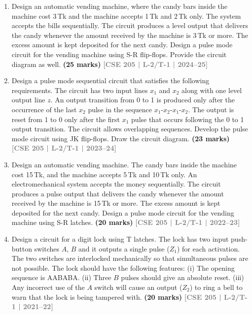 \documentclass[12pt,a3paper]{article}
\newcommand{\yr}[1]{\hfill\textcolor{gray}{\small\textbf{[#1]}}}
\newcommand{\mk}[1]{\textcolor{orange!70!black}{\small\textbf{(#1 marks)}}}
\begin{document}
\begin{enumerate}

\item Design an automatic vending machine, where the candy bars inside the machine cost 3\,Tk and the machine accepts 1\,Tk and 2\,Tk only. The system accepts the bills sequentially. The circuit produces a level output that delivers the candy whenever the amount received by the machine is 3\,Tk or more. The excess amount is kept deposited for the next candy. Design a pulse mode circuit for the vending machine using S-R flip-flops. Provide the circuit diagram as well.
\mk{25} \yr{CSE 205 | L-2/T-1 | 2024--25}

\item Design a pulse mode sequential circuit that satisfies the following requirements. The circuit has two input lines $x_1$ and $x_2$ along with one level output line $z$. An output transition from 0 to 1 is produced only after the occurrence of the last $x_2$ pulse in the sequence $x_1\text{-}x_2\text{-}x_1\text{-}x_2$. The output is reset from 1 to 0 only after the first $x_1$ pulse that occurs following the 0 to 1 output transition. The circuit allows overlapping sequences. Develop the pulse mode circuit using JK flip-flops. Draw the circuit diagram.
\mk{23} \yr{CSE 205 | L-2/T-1 | 2023--24}

\item Design an automatic vending machine. The candy bars inside the machine cost 15\,Tk, and the machine accepts 5\,Tk and 10\,Tk only. An electromechanical system accepts the money sequentially. The circuit produces a pulse output that delivers the candy whenever the amount received by the machine is 15\,Tk or more. The excess amount is kept deposited for the next candy. Design a pulse mode circuit for the vending machine using S-R latches.
\mk{20} \yr{CSE 205 | L-2/T-1 | 2022--23}

\item Design a circuit for a digit lock using T latches. The lock has two input push-button switches $A$, $B$ and it outputs a single pulse ($Z_1$) for each activation. The two switches are interlocked mechanically so that simultaneous pulses are not possible. The lock should have the following features: (i) The opening sequence is AABABA. (ii) Three $B$ pulses should give an absolute reset. (iii) Any incorrect use of the $A$ switch will cause an output ($Z_2$) to ring a bell to warn that the lock is being tampered with.
\mk{20} \yr{CSE 205 | L-2/T-1 | 2021--22}


\end{enumerate}
\end{document}
